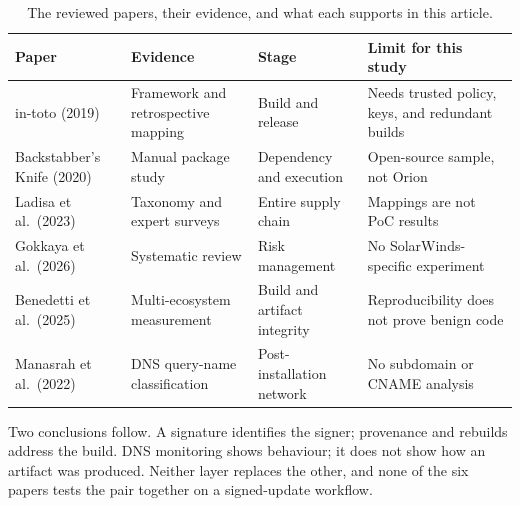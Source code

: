 \begin{table}[H]
\centering
\footnotesize
\caption{The reviewed papers, their evidence, and what each supports in this article.}
\label{tab:papers}
\begin{tabular}{@{}>{\RaggedRight}p{2.3cm}>{\RaggedRight}p{3.3cm}>{\RaggedRight}p{4.2cm}>{\RaggedRight}p{4.9cm}@{}}
\toprule
\textbf{Paper} & \textbf{Evidence} & \textbf{Stage} & \textbf{Limit for this study} \\
\midrule
in-toto (2019) & Framework and retrospective mapping & Build and release & Needs trusted policy, keys, and redundant builds \\
Backstabber's Knife (2020) & Manual package study & Dependency and execution & Open-source sample, not Orion \\
Ladisa et al.\ (2023) & Taxonomy and expert surveys & Entire supply chain & Mappings are not PoC results \\
Gokkaya et al.\ (2026) & Systematic review & Risk management & No SolarWinds-specific experiment \\
Benedetti et al.\ (2025) & Multi-ecosystem measurement & Build and artifact integrity & Reproducibility does not prove benign code \\
Manasrah et al.\ (2022) & DNS query-name classification & Post-installation network & No subdomain or CNAME analysis \\
\bottomrule
\end{tabular}
\end{table}

Two conclusions follow. A signature identifies the signer; provenance and rebuilds address the build. DNS monitoring shows behaviour; it does not show how an artifact was produced. Neither layer replaces the other, and none of the six papers tests the pair together on a signed-update workflow.
